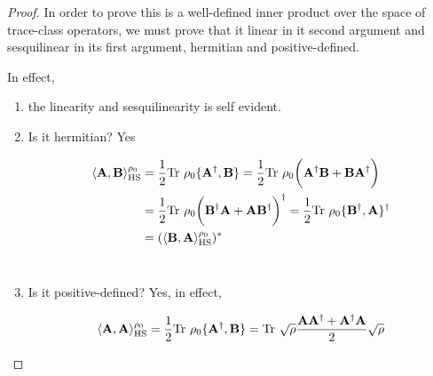 \documentclass{homework}
\begin{document}
\begin{proof}

In order to prove this is a well-defined inner product over the space of trace-class operators, we must prove that it linear in it second argument and sesquilinear in its first argument, hermitian and positive-defined. 



In effect, 

\begin{enumerate}
    \item the linearity and sesquilinearity is self evident. \\
    \item Is it hermitian? Yes
    
    \begin{equation}
    \begin{split}
        \langle {\bf A}, {\bf B} \rangle_{\textnormal{HS}}^{\rho_0} &= \frac{1}{2}\textnormal{Tr } \rho_0 \{{\bf A}^\dagger, {\bf B}\} = \frac{1}{2} \textnormal{Tr } \rho_0 \bigg({\bf A}^\dagger {\bf B} + {\bf B} {\bf A}^\dagger \bigg)  \\
        &= \frac{1}{2} \textnormal{Tr } \rho_0 \bigg( {\bf B}^\dagger {\bf A}  + {\bf A} {\bf B}^\dagger \bigg)^{\dagger} =  \frac{1}{2}\textnormal{Tr } \rho_0 \{{\bf B}^\dagger, {\bf A}\}^\dagger \\
        &= (\langle {\bf B}, {\bf A} \rangle_{\textnormal{HS}}^{\rho_0})^{*}
        \end{split}
    \end{equation} \\
    
    \item Is it positive-defined? Yes, in effect,
    
    \begin{equation}
        \begin{split}
            \langle {\bf A}, {\bf A} \rangle_{\textnormal{HS}}^{\rho_0}  &=  \frac{1}{2}\textnormal{Tr } \rho_0 \{{\bf A}^\dagger, {\bf B}\} = \textnormal{Tr } \sqrt{\rho} \frac{{\bf A} {\bf A}^{\dagger} + {\bf A}^{\dagger} {\bf A}}{2}\sqrt{\rho} \\
        \end{split}
    \end{equation}
\end{enumerate}
\end{proof}
\end{document}
